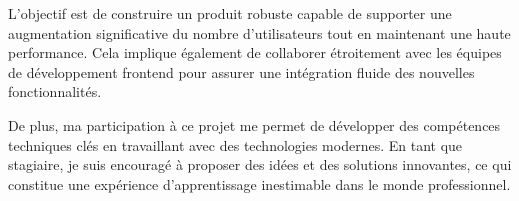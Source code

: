 L'objectif est de construire un produit robuste capable de supporter une augmentation significative du nombre d'utilisateurs tout en maintenant une haute performance. Cela implique également de collaborer étroitement avec les équipes de développement frontend pour assurer une intégration fluide des nouvelles fonctionnalités.

De plus, ma participation à ce projet me permet de développer des compétences techniques clés en travaillant avec des technologies modernes. En tant que stagiaire, je suis encouragé à proposer des idées et des solutions innovantes, ce qui constitue une expérience d'apprentissage inestimable dans le monde professionnel.
